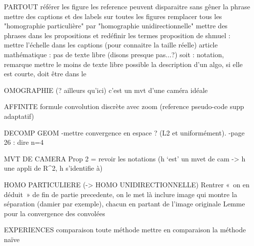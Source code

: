 PARTOUT
	référer les figure
	les reference peuvent disparaitre sans gêner la phrase
	mettre des captions et des labels sur toutes les figures
	remplacer tous les "homographie particulière" par "homographie unidirectionnelle"
	mettre des phrases dans les propositions et redéfinir les termes
	proposition de shmuel : mettre l'échelle dans les captions (pour connaitre la taille réelle)
	article mathématique : pas de texte libre (disons presque pas...?)
		soit : notation, remarque
	mettre le moins de texte libre possible
	la description d'un algo, si elle est courte, doit être dans le \caption



HOMOGRAPHIE (? ailleurs qu'ici)
	c’est un mvt d’une caméra idéale



AFFINITE
	formule convolution discrète avec zoom (reference pseudo-code supp adaptatif)


DECOMP GEOM 
	-mettre convergence en espace ? (L2 et uniformément).
	-page 26 : dire n=4


MVT DE CAMERA
	Prop 2 = revoir les notations (h ‘est’ un mvet de cam -> h une appli de R^2, h s'identifie à)


HOMO PARTICULIERE (-> HOMO UNIDIRECTIONNELLE)
	Rentrer « on en déduit » de fin de partie precedente, on le met là
	inclure image qui montre la séparation (damier par exemple), chacun en partant de l'image originale
	Lemme pour la convergence des convolées



EXPERIENCES
	comparaison toute méthode
	mettre en comparaison la méthode naïve
